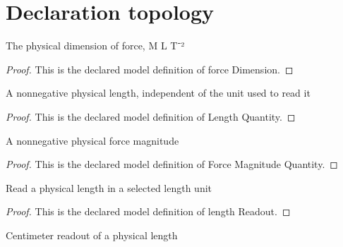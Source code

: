 \section{Declaration topology}
\begin{definition}
  \label{def:physics:phyx-mini-0710:phyxminiproblems-problemphyxmini0710-forcedimension}
  The physical dimension of force, M L T⁻²
\end{definition}
\begin{proof}
  This is the declared model definition of force Dimension.
\end{proof}
\begin{definition}
  \label{def:physics:phyx-mini-0710:phyxminiproblems-problemphyxmini0710-lengthquantity}
  A nonnegative physical length, independent of the unit used to read it
\end{definition}
\begin{proof}
  This is the declared model definition of Length Quantity.
\end{proof}
\begin{definition}
  \label{def:physics:phyx-mini-0710:phyxminiproblems-problemphyxmini0710-forcemagnitudequantity}
  A nonnegative physical force magnitude
\end{definition}
\begin{proof}
  This is the declared model definition of Force Magnitude Quantity.
\end{proof}
\begin{definition}
  \label{def:physics:phyx-mini-0710:phyxminiproblems-problemphyxmini0710-lengthreadout}
  Read a physical length in a selected length unit
\end{definition}
\begin{proof}
  This is the declared model definition of length Readout.
\end{proof}
\begin{definition}
  \label{def:physics:phyx-mini-0710:phyxminiproblems-problemphyxmini0710-lengthincentimeters}
  Centimeter readout of a physical length
\end{definition}
